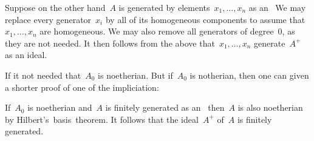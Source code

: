 Suppose on the other hand~$A$ is generated by elements~$x_1, \dotsc, x_n$ as an~
We may replace every generator~$x_i$ by all of its homogeneous components to assume that~$x_1, \dotsc, x_n$ are homogeneous.
We may also remove all generators of degree~$0$, as they are not needed.
It then follows from the above  that~$x_1, \dotsc, x_n$ generate~$A^+$ as an ideal.

\begin{remark}
  If it not needed that~$A_0$ is noetherian.
  But if~$A_0$ is notherian, then one can given a shorter proof of one of the impliciation:
  
  If~$A_0$ is noetherian and~$A$ is finitely generated as an~ then~$A$ is also noetherian by Hilbert’s~basis~theorem.
  It follows that the ideal~$A^+$ of~$A$ is finitely generated.
\end{remark}




